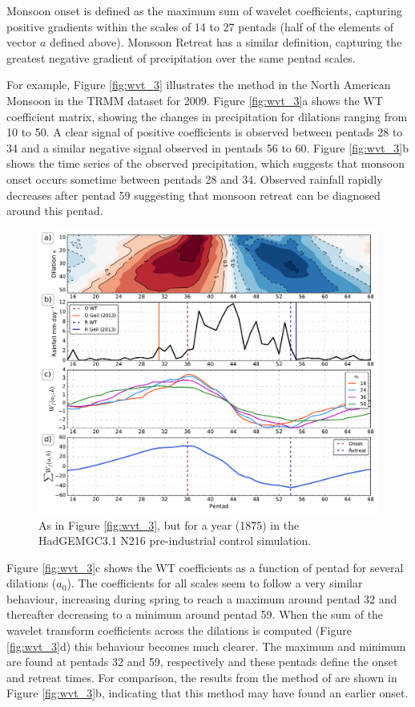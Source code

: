  Monsoon onset is defined as the maximum sum of wavelet coefficients, capturing positive gradients within the scales of 14 to 27 pentads (half of the elements of vector $a$ defined above). Monsoon Retreat has a similar definition, capturing the greatest negative gradient of precipitation over the same pentad scales.

For example, Figure \ref{fig:wvt_3} illustrates the method in the North American Monsoon in the TRMM dataset for 2009. Figure \ref{fig:wvt_3}a shows the WT coefficient matrix, showing the changes in precipitation for dilations ranging from 10 to 50. A clear signal of positive coefficients is observed between pentads 28 to 34  and a similar negative signal observed in pentads 56 to 60. Figure \ref{fig:wvt_3}b shows the time series of the observed precipitation, which suggests that monsoon onset occurs sometime between pentads 28 and 34. Observed rainfall rapidly decreases after pentad 59 suggesting that monsoon retreat can be diagnosed around this pentad.

\begin{figure}[t!]
 \includegraphics[width=\linewidth]{figures/nam_n216.pdf}
\caption[Example determination of onset and retreat in HadGEM3 N216]{ As in Figure \ref{fig:wvt_3}, but for a year (1875) in the HadGEMGC3.1 N216 pre-industrial control simulation.  }
\label{fig:s1_n216}
\end{figure}

 Figure \ref{fig:wvt_3}c shows the WT coefficients as a function of pentad for several dilations ($a_0$). The coefficients for all scales seem to follow a very similar behaviour, increasing during spring to reach a maximum around pentad 32 and thereafter decreasing to a minimum around pentad 59. When the sum of the wavelet transform coefficients across the dilations is computed (Figure \ref{fig:wvt_3}d) this behaviour becomes much clearer. The maximum and minimum are found at pentads 32 and 59, respectively and these pentads define the onset and retreat times. For comparison, the results from the method of \cite{geil2013} are shown in Figure \ref{fig:wvt_3}b, indicating that this method may have found an earlier onset. 
 
